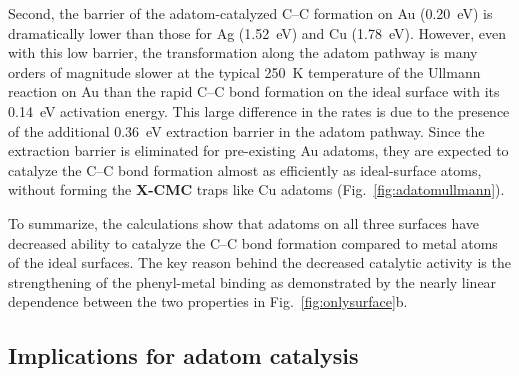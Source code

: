 \documentclass[aps,prb,reprint,amsmath,amssymb]{revtex4-1}
\begin{document}
Second, the barrier of the adatom-catalyzed C--C formation on Au (\SI{0.20}{\electronvolt}) is dramatically lower than those for Ag (\SI{1.52}{\electronvolt}) and Cu (\SI{1.78}{\electronvolt}). 
However, even with this low barrier, the transformation along the adatom pathway is many orders of magnitude slower at the typical \SI{250}{\kelvin} temperature of the Ullmann reaction on Au than the rapid C--C bond formation on the ideal surface with its \SI{0.14}{\electronvolt} activation energy. This large difference in the rates is due to the presence of the additional \SI{0.36}{\electronvolt} extraction barrier in the adatom pathway. 
%
Since the extraction barrier is eliminated for pre-existing Au adatoms, they are expected to catalyze the C--C bond formation almost as efficiently as ideal-surface atoms, without forming the \textbf{X-CMC} traps like Cu adatoms (Fig.~\ref{fig:adatomullmann}).

To summarize, the calculations show that adatoms on all three surfaces have decreased ability to catalyze the C--C bond formation compared to metal atoms of the ideal surfaces. 
The key reason behind the decreased catalytic activity is the strengthening of the phenyl-metal binding as demonstrated by the nearly linear dependence between the two properties in Fig.~\ref{fig:onlysurface}b.



\ifdefined\INTERNAL
\subsection{Implications for adatom catalysis}
\fi
\end{document}
